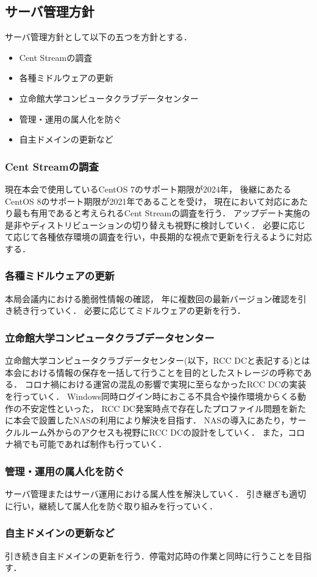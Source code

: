 \subsection*{サーバ管理方針}


サーバ管理方針として以下の五つを方針とする．
\begin{itemize}
    \item Cent Streamの調査
    \item 各種ミドルウェアの更新
    \item 立命館大学コンピュータクラブデータセンター
    \item 管理・運用の属人化を防ぐ
    \item 自主ドメインの更新など
\end{itemize}

\subsubsection*{Cent Streamの調査}
現在本会で使用しているCentOS 7のサポート期限が2024年，
後継にあたるCentOS 8のサポート期限が2021年であることを受け，
現在において対応にあたり最も有用であると考えられるCent Streamの調査を行う．
アップデート実施の是非やディストリビューションの切り替えも視野に検討していく．
必要に応じて応じて各種依存環境の調査を行い，中長期的な視点で更新を行えるように対応する．

\subsubsection*{各種ミドルウェアの更新}
本局会議内における脆弱性情報の確認，
年に複数回の最新バージョン確認を引き続き行っていく．
必要に応じてミドルウェアの更新を行う．

\subsubsection*{立命館大学コンピュータクラブデータセンター}
立命館大学コンピュータクラブデータセンター(以下，RCC DCと表記する)とは本会における情報の保存を一括して行うことを目的としたストレージの呼称である．
コロナ禍における運営の混乱の影響で実現に至らなかったRCC DCの実装を行っていく．
Windows同時ログイン時におこる不具合や操作環境からくる動作の不安定性といった，
RCC DC発案時点で存在したプロファイル問題を新たに本会で設置したNASの利用により解決を目指す．
NASの導入にあたり，サークルルーム外からのアクセスも視野にRCC DCの設計をしていく．
また，コロナ禍でも可能であれば制作も行っていく．

\subsubsection*{管理・運用の属人化を防ぐ}
サーバ管理またはサーバ運用における属人性を解決していく．
引き継ぎも適切に行い，継続して属人化を防ぐ取り組みを行っていく．

\subsubsection*{自主ドメインの更新など}
引き続き自主ドメインの更新を行う．停電対応時の作業と同時に行うことを目指す．
